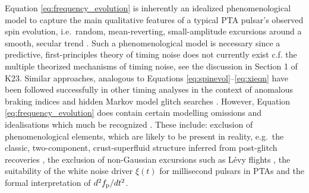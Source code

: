 \documentclass[fleqn,usenatbib,useAMS]{mnras}
\begin{document}
Equation \ref{eq:frequency_evolution} is inherently an idealized phenomenological model to capture the main qualitative features of a typical PTA pulsar's observed spin evolution, i.e.\ random, mean-reverting, small-amplitude excursions around a smooth, secular trend \citep{NANOgrav2023,EPTA2023,Zic2023arXiv230616230Z}. Such a phenomenological model is necessary since a predictive, first-principles theory of timing noise does not currently exist c.f. the multiple theorized mechanisms of timing noise, see the discussion in Section 1 of K23. Similar approaches, analogous to Equations \eqref{eq:spinevol}--\eqref{eq:xieqn} have been followed successfully in other timing analyses in the context of anomalous braking indices \citep{Vargas} and hidden Markov model glitch searches \citep{Melatos2020ApJ...896...78M,Lower2021MNRAS.508.3251L,Dunn2022,Dunn2023MNRAS.522.5469D}. However, Equation \eqref{eq:frequency_evolution} does contain certain modelling omissions and idealisations which much be recognized \citep{Meyers2021,Myers2021MNRAS.502.3113M,Vargas}. These include: exclusion of phenomenological elements, which are likely to be present in reality, e.g.\ the classic, two-component, crust-superfluid structure inferred from post-glitch recoveries \citep{Baym1969,vanEysden,Alpar2017MNRAS.471.4827G,Myers2021MNRAS.502.3113M,Meyers2021}, the exclusion of non-Gaussian excursions such as L\'{e}vy flights \citep{Sornette2004}, the suitability of the white noise driver $\xi(t)$ for millisecond pulsars in PTAs and the formal interpretation of $d^2 f_{\rm p} / dt^2$. 
\end{document}
